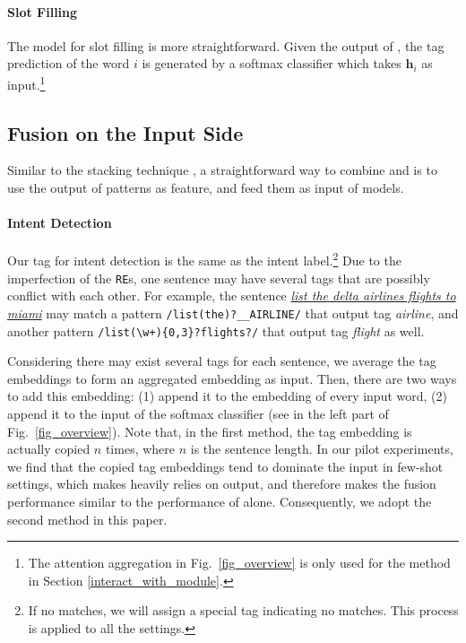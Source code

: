 \paragraph{Slot Filling}
The model for slot filling is more straightforward. Given the output of \BLSTM, the tag prediction of the word $i$ is generated by a softmax classifier which takes $\textbf{h}_i$ as input.\footnote{The attention aggregation in Fig.~\ref{fig_overview} is only used for the method in Section \ref{interact_with_module}.}


\subsection{Fusion on the Input Side}
\label{fusion_with_input}
Similar to the stacking technique \cite{wolpert1992stacked}, a straightforward way to combine \RE and \NN is to use the output of \RE patterns as feature, and feed them as input of \NN models.
\paragraph{Intent Detection}
Our \RE tag for intent detection is the same as the intent label.\footnote{If no \RE matches, we will assign a special tag indicating no matches. This process is applied to all the settings.} 
Due to the imperfection of the \texttt{RE}s, one sentence may have several \RE tags that are possibly conflict with each other.
For example, the sentence \textsl{\underline{list the delta airlines flights to miami}} may match a pattern \texttt{/list(\;the)?\;\_\_AIRLINE/} that output tag \emph{airline}, 
and another pattern \texttt{/list(\;\textbackslash w+)\{0,3\}?\;flights?/} that output tag \emph{flight} as well.

Considering there may exist several \RE tags for each sentence, we average the tag embeddings to form an aggregated embedding as input. 
Then, there are two ways to add this embedding: (1) append it to the embedding of every input word, (2) append it to the input of the softmax classifier (see  in the left part of Fig.~\ref{fig_overview}).
Note that, in the first method, the tag embedding is actually copied $n$ times, where $n$ is the sentence length. 
In our pilot experiments, we find that the copied tag embeddings tend to dominate the input in few-shot settings, which makes \NN heavily relies on \RE output, and therefore makes the fusion performance similar to the performance of \RE alone. Consequently, we adopt the second method in this paper.

